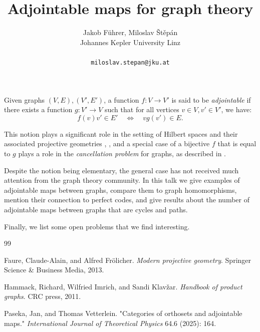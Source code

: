 \documentclass[a4paper]{article} %
\date{} %
\begin{document}
\setcounter{page}{1} %

\title{Adjointable maps for graph theory}

\author{Jakob Führer, Miloslav Štěpán \\ %
       Johannes Kepler University Linz\\ \\ %
       \texttt{miloslav.stepan@jku.at} %
       }%

\maketitle

Given graphs $(V,E), (V',E')$, a function $f: V \to V'$ is said to be \textit{adjointable} if there exists a function $g : V' \to V$ such that for all vertices $v \in V, v' \in V'$, we have:
\[ f(v)v' \in E' \quad \iff \quad vg(v') \in E.\]

This notion plays a significant role in the setting of Hilbert spaces and their associated projective geometries \cite{pv25}, \cite[Chapter 14]{ff13}, and a special case of a bijective $f$ that is equal to $g$ plays a role in the \textit{cancellation problem} for graphs, as described in \cite[Chapter 9]{hik11}.

Despite the notion being elementary, the general case has not received much attention from the graph theory community. In this talk we give examples of adjointable maps between graphs, compare them to graph homomorphisms, mention their connection to perfect codes, and give results about the number of adjointable maps between graphs that are cycles and paths.



Finally, we list some open problems that we find interesting.


\begin{thebibliography}{99}


Faure, Claude-Alain, and Alfred Frölicher.
\newblock \emph{Modern projective geometry}.
\newblock Springer Science \& Business Media, 2013.

Hammack, Richard, Wilfried Imrich, and Sandi Klavžar.
\newblock \emph{Handbook of product graphs}.
\newblock CRC press, 2011.

Paseka, Jan, and Thomas Vetterlein.
\newblock "Categories of orthosets and adjointable maps."
\newblock \emph{International Journal of Theoretical Physics} 64.6 (2025): 164.



\end{thebibliography}
\end{document}

